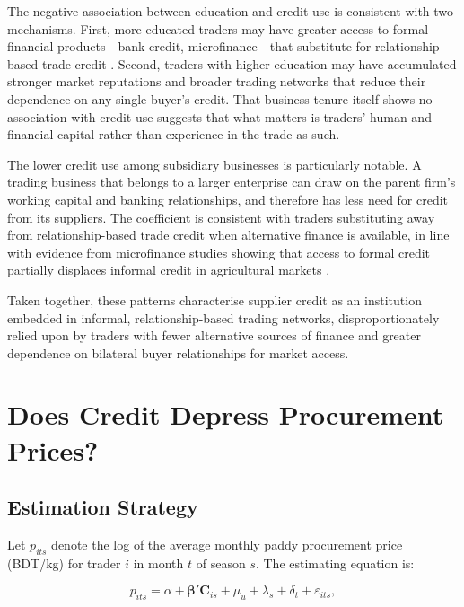 \documentclass[authoryear,preprint,review,12pt]{elsarticle}
\begin{document}
The negative association between education and credit use is consistent
with two mechanisms. First, more educated traders may have greater access
to formal financial products---bank credit, microfinance---that substitute
for relationship-based trade credit \citep{conning_udry2007}. Second,
traders with higher education may have accumulated stronger market
reputations and broader trading networks that reduce their dependence on
any single buyer's credit. That business tenure itself shows no association
with credit use suggests that what matters is traders' human and financial
capital rather than experience in the trade as such.

The lower credit use among subsidiary businesses is particularly notable.
A trading business that belongs to a larger enterprise can draw on the
parent firm's working capital and banking relationships, and therefore has
less need for credit from its suppliers. The coefficient is consistent with
traders substituting away from relationship-based trade credit when
alternative finance is available, in line with evidence from microfinance
studies showing that access to formal credit partially displaces informal
credit in agricultural markets \citep{karlan_etal2014}.

Taken together, these patterns characterise supplier credit as an institution
embedded in informal, relationship-based trading networks, disproportionately
relied upon by traders with fewer alternative sources of finance and greater
dependence on bilateral buyer relationships for market access.

\section{Does Credit Depress Procurement Prices?}
\label{sec:prices}

\subsection{Estimation Strategy}

Let $p_{its}$ denote the log of the average monthly paddy procurement price
(BDT/kg) for trader $i$ in month $t$ of season $s$. The estimating equation is:

\begin{equation}
  \label{eq:ols}
  p_{its} = \alpha + \boldsymbol{\beta}' \mathbf{C}_{is}
            + \mu_u + \lambda_s + \delta_t + \varepsilon_{its},
\end{equation}
\end{document}
